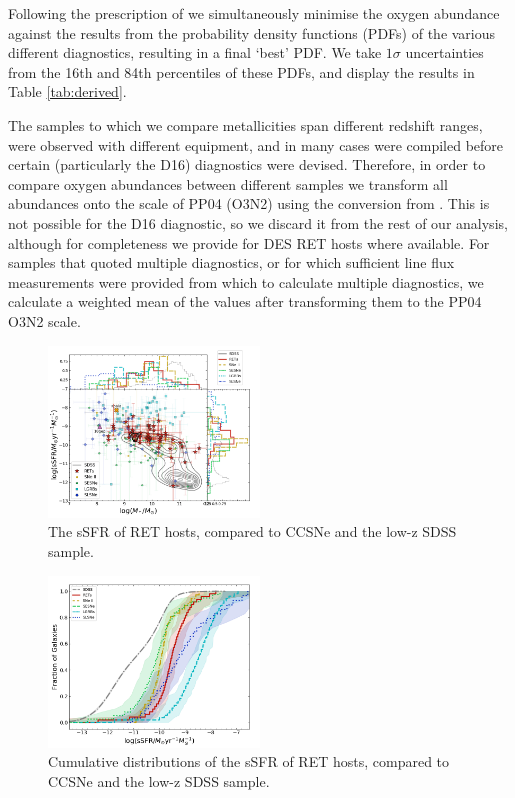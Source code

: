 \documentclass[fleqn,usenatbib,]{mnras}
\begin{document}
Following the prescription of \citet{Kruehler2015} we simultaneously minimise the oxygen abundance against the results from the probability density functions (PDFs) of the various different diagnostics, resulting in a final `best' PDF. We take $1\sigma$ uncertainties from the 16th and 84th percentiles of these PDFs, and display the results in Table \ref{tab:derived}.

The samples to which we compare metallicities span different redshift ranges, were observed with different equipment, and in many cases were compiled before certain (particularly the D16) diagnostics were devised. Therefore, in order to compare oxygen abundances between different samples we transform all abundances onto the scale of PP04 (O3N2) using the conversion from \citet{Kewley2008}. This is not possible for the D16 diagnostic, so we discard it from the rest of our analysis, although for completeness we provide for DES RET hosts where available. For samples that quoted multiple diagnostics, or for which sufficient line flux measurements were provided from which to calculate multiple diagnostics, we calculate a weighted mean of the values after transforming them to the PP04 O3N2 scale.

\begin{figure}
\includegraphics[width=0.5\textwidth]{figs/sSFR_Mike.png}
\caption{The sSFR of RET hosts, compared to CCSNe and the low-z SDSS sample.
\label{fig:sfms_ssfr}}
\end{figure}

\begin{figure}
\includegraphics[width=0.5\textwidth]{figs/cum_sSFR_mike.png}
\caption{Cumulative distributions of the sSFR of RET hosts, compared to CCSNe and the low-z SDSS sample.
\label{fig:ssfr_cum}}
\end{figure}
\end{document}
